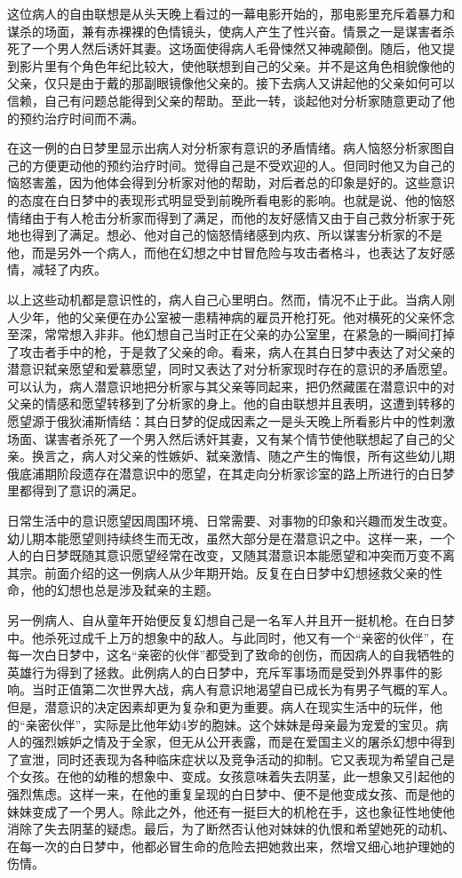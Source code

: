 \documentclass[UTF8,10pt,a4paper,openany]{book}
\begin{document}
这位病人的自由联想是从头天晚上看过的一幕电影开始的，那电影里充斥着暴力和谋杀的场面，兼有赤裸裸的色情镜头，使病人产生了性兴奋。情景之一是谋害者杀死了一个男人然后诱奸其妻。这场面使得病人毛骨悚然又神魂颠倒。随后，他又提到影片里有个角色年纪比较大，使他联想到自己的父亲。并不是这角色相貌像他的父亲，仅只是由于戴的那副眼镜像他父亲的。接下去病人又讲起他的父亲如何可以信赖，自己有问题总能得到父亲的帮助。至此一转，谈起他对分析家随意更动了他的预约治疗时间而不满。

在这一例的白日梦里显示出病人对分析家有意识的矛盾情绪。病人恼怒分析家图自己的方便更动他的预约治疗时间。觉得自己是不受欢迎的人。但同时他又为自己的恼怒害羞，因为他体会得到分析家对他的帮助，对后者总的印象是好的。这些意识的态度在白日梦中的表现形式明显受到前晚所看电影的影响。也就是说、他的恼怒情绪由于有人枪击分析家而得到了满足，而他的友好感情又由于自己救分析家于死地也得到了满足。想必、他对自己的恼怒情绪感到内疚、所以谋害分析家的不是他，而是另外一个病人，而他在幻想之中甘冒危险与攻击者格斗，也表达了友好感情，减轻了内疚。

以上这些动机都是意识性的，病人自己心里明白。然而，情况不止于此。当病人刚人少年，他的父亲便在办公室被一患精神病的雇员开枪打死。他对横死的父亲怀念至深，常常想入非非。他幻想自己当时正在父亲的办公室里，在紧急的一瞬间打掉了攻击者手中的枪，于是救了父亲的命。看来，病人在其白日梦中表达了对父亲的潜意识弑亲愿望和爱慕愿望，同时又表达了对分析家现时存在的意识的矛盾愿望。可以认为，病人潜意识地把分析家与其父亲等同起来，把仍然藏匿在潜意识中的对父亲的情感和愿望转移到了分析家的身上。他的自由联想并且表明，这遭到转移的愿望源于俄狄浦斯情结：其白日梦的促成因素之一是头天晚上所看影片中的性刺激场面、谋害者杀死了一个男入然后诱奸其妻，又有某个情节使他联想起了自己的父亲。换言之，病人对父亲的性嫉妒、弑亲激情、随之产生的悔恨，所有这些幼儿期俄底浦期阶段遗存在潜意识中的愿望，在其走向分析家诊室的路上所进行的白日梦里都得到了意识的满足。

日常生活中的意识愿望因周围环境、日常需要、对事物的印象和兴趣而发生改变。幼儿期本能愿望则持续终生而无改，虽然大部分是在潜意识之中。这样一来，一个人的白日梦既随其意识愿望经常在改变，又随其潜意识本能愿望和冲突而万变不离其宗。前面介绍的这一例病人从少年期开始。反复在白日梦中幻想拯救父亲的性命，他的幻想也总是涉及弑亲的主题。

另一例病人、自从童年开始便反复幻想自己是一名军人并且开一挺机枪。在白日梦中。他杀死过成千上万的想象中的敌人。与此同时，他又有一个“亲密的伙伴”，在每一次白日梦中，这名“亲密的伙伴”都受到了致命的创伤，而因病人的自我牺牲的英雄行为得到了拯救。此例病人的白日梦中，充斥军事场而是受到外界事件的影响。当时正值第二次世界大战，病人有意识地渴望自已成长为有男子气概的军人。但是，潜意识的决定因素却更为复杂和更为重要。病人在现实生活中的玩伴，他的“亲密伙伴”，实际是比他年幼4岁的胞妹。这个妹妹是母亲最为宠爱的宝贝。病人的强烈嫉妒之情及于全家，但无从公开表露，而是在爱国主义的屠杀幻想中得到了宣泄，同时还表现为各种临床症状以及竞争活动的抑制。它又表现为希望自己是个女孩。在他的幼稚的想象中、变成。女孩意味着失去阴茎，此一想象又引起他的强烈焦虑。这样一来，在他的重复呈现的白日梦中、便不是他变成女孩、而是他的妹妹变成了一个男人。除此之外，他还有一挺巨大的机枪在手，这也象征性地使他消除了失去阴茎的疑虑。最后，为了断然否认他对妹妹的仇恨和希望她死的动机、在每一次的白日梦中，他都必冒生命的危险去把她救出来，然增又细心地护理她的伤情。
\end{document}
